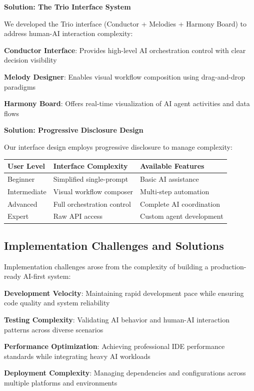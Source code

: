 \textbf{Solution: The Trio Interface System}

We developed the Trio interface (Conductor + Melodies + Harmony Board) to address human-AI interaction complexity:

\begin{compactlist}
    \item \textbf{Conductor Interface}: Provides high-level AI orchestration control with clear decision visibility
    \item \textbf{Melody Designer}: Enables visual workflow composition using drag-and-drop paradigms
    \item \textbf{Harmony Board}: Offers real-time visualization of AI agent activities and data flows
\end{compactlist}

\textbf{Solution: Progressive Disclosure Design}

Our interface design employs progressive disclosure to manage complexity:

\begin{center}
\begin{tabular}{@{}lll@{}}
\toprule
\textbf{User Level} & \textbf{Interface Complexity} & \textbf{Available Features} \\
\midrule
Beginner & Simplified single-prompt & Basic AI assistance \\
Intermediate & Visual workflow composer & Multi-step automation \\
Advanced & Full orchestration control & Complete AI coordination \\
Expert & Raw API access & Custom agent development \\
\bottomrule
\end{tabular}
\end{center}

\subsection*{Implementation Challenges and Solutions}

Implementation challenges arose from the complexity of building a production-ready AI-first system:

\begin{expandedlist}
    \item \textbf{Development Velocity}: Maintaining rapid development pace while ensuring code quality and system reliability
    \item \textbf{Testing Complexity}: Validating AI behavior and human-AI interaction patterns across diverse scenarios
    \item \textbf{Performance Optimization}: Achieving professional IDE performance standards while integrating heavy AI workloads
    \item \textbf{Deployment Complexity}: Managing dependencies and configurations across multiple platforms and environments
\end{expandedlist}

